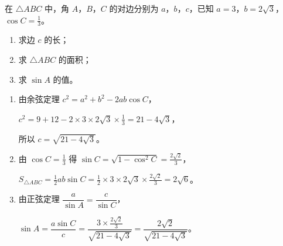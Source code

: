\documentclass{exam-zh}
\begin{document}
\begin{problem}[points = 14]
  在 $\triangle ABC$ 中，角 $A$，$B$，$C$ 的对边分别为 $a$，$b$，$c$，已知 $a = 3$，$b = 2\sqrt{3}$，$\cos C = \frac{1}{3}$。

  \begin{enumerate}
    \item 求边 $c$ 的长；
    \item 求 $\triangle ABC$ 的面积；
    \item 求 $\sin A$ 的值。
  \end{enumerate}

  \begin{solution}
    \begin{enumerate}
      \item 由余弦定理 $c^2 = a^2 + b^2 - 2ab\cos C$，

      $c^2 = 9 + 12 - 2 \times 3 \times 2\sqrt{3} \times \frac{1}{3} = 21 - 4\sqrt{3}$，

      所以 $c = \sqrt{21 - 4\sqrt{3}}$。

      \item 由 $\cos C = \frac{1}{3}$ 得 $\sin C = \sqrt{1 - \cos^2 C} = \frac{2\sqrt{2}}{3}$，

      $S_{\triangle ABC} = \frac{1}{2}ab\sin C = \frac{1}{2} \times 3 \times 2\sqrt{3} \times \frac{2\sqrt{2}}{3} = 2\sqrt{6}$。

      \item 由正弦定理 $\dfrac{a}{\sin A} = \dfrac{c}{\sin C}$，

      $\sin A = \dfrac{a\sin C}{c} = \dfrac{3 \times \frac{2\sqrt{2}}{3}}{\sqrt{21 - 4\sqrt{3}}} = \dfrac{2\sqrt{2}}{\sqrt{21 - 4\sqrt{3}}}$。
    \end{enumerate}
  \end{solution}
\end{problem}
\end{document}
